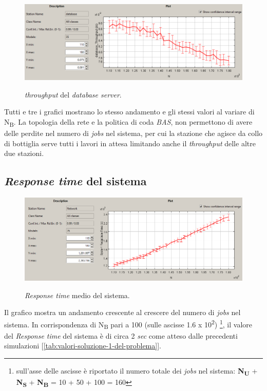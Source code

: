 \documentclass[../main.tex]{subfiles}
\begin{document}
    \begin{figure}[H]
        \centering
        \includegraphics[scale = 0.6]{assets/db_th_1.PNG}\\
        \caption[\textit{Throughput} del \textit{database server}]{\textit{throughput} del \textit{database server}.}
        \label{fig:throughput-time-db}
    \end{figure}
    Tutti e tre i grafici mostrano lo stesso andamento e gli stessi valori al variare di N\textsubscript{B}.
    La topologia della rete e la politica di coda \textit{BAS}, non permettono di avere delle perdite nel numero di
    \textit{jobs} nel sistema, per cui la stazione che agisce da collo di bottiglia serve tutti i lavori in attesa
    limitando anche il \textit{throughput} delle altre due stazioni.

    \subsection{\textit{Response time} del sistema}\label{subsec:response-time-del-sistema}
    \begin{figure}[H]
        \centering
        \includegraphics[scale = 0.6]{assets/res_sys_1.PNG}\\
        \caption[\textit{Response time} medio del sistema]{\textit{Response time} medio del sistema.}
        \label{fig:response-time-system}
    \end{figure}
    Il grafico mostra un andamento crescente al crescere del numero di \textit{jobs} nel sistema.
    In corrispondenza di N\textsubscript{B} pari a 100 (sulle ascisse 1.6 x 10\textsuperscript{2}) \footnote{sull'asse delle ascisse è riportato
    il numero totale dei \textit{jobs} nel sistema: \textbf{N\textsubscript{U}} + \textbf{N\textsubscript{S}} +
    \textbf{N\textsubscript{B}} = 10 + 50 + 100 = 160}, il valore del \textit{Response time} del sistema è di circa 2
    \textit{sec} come atteso dalle precedenti simulazioni [\ref{tab:valori-soluzione-1-del-problema}].
\end{document}
